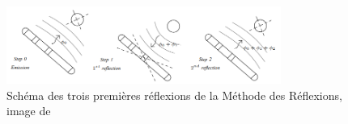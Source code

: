 \begin{figure}[h!]
    \centering
    \includegraphics[width=0.8\textwidth]{doc/img/reflexions.png}
    \caption{Schéma des trois premières réflexions de la Méthode des Réflexions, image de \cite{Boyer2012}}
    \label{fig:reflexions}
\end{figure}

